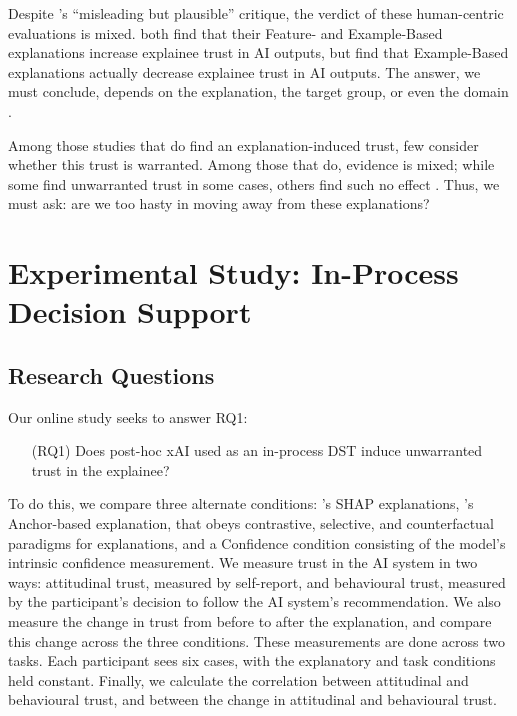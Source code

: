 Despite \textcite{Lipton}'s ``misleading but plausible'' critique, the verdict of these human-centric evaluations is mixed. \textcite{lai_human_2019,jacobs_how_2021} both find that their Feature- and Example-Based explanations increase explainee trust in AI outputs, but \textcite{binns_its_2018} find that Example-Based explanations actually decrease explainee trust in AI outputs. The answer, we must conclude, depends on the explanation, the target group, or even the domain \cite{mohseni_trust_nodate}. 

Among those studies that do find an explanation-induced trust, few consider whether this trust is warranted. Among those that do, evidence is mixed; while some find unwarranted trust in some cases, others find such no effect \cite{lai_human_2019,jacobs_how_2021}. Thus, we must ask: are we too hasty in moving away from these explanations? 

\section[Experimental Study]{Experimental Study: In-Process Decision Support}\label{sec:online}
\subsection{Research Questions}
Our online study seeks to answer RQ1:

\begin{enumerate}
    \item[(RQ1)] Does post-hoc xAI used as an in-process DST induce unwarranted trust in the explainee?
\end{enumerate}

To do this, we compare three alternate conditions: \textcite{lundberg_unified_2017}'s SHAP explanations, \textcite{ribeiro_anchors_2018}'s Anchor-based explanation, that obeys contrastive, selective, and counterfactual paradigms for explanations, and a Confidence condition consisting of the model's intrinsic confidence measurement. We measure trust in the AI system in two ways: attitudinal trust, measured by self-report, and behavioural trust, measured by the participant's decision to follow the AI system's recommendation. We also measure the change in trust from before to after the explanation, and compare this change across the three conditions. These measurements are done across two tasks. Each participant sees six cases, with the explanatory and task conditions held constant. Finally, we calculate the correlation between attitudinal and behavioural trust, and between the change in attitudinal and behavioural trust.

